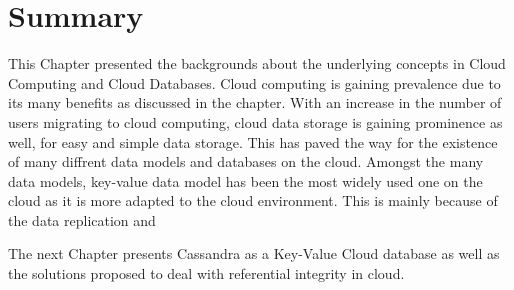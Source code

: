 \section{Summary}
	This Chapter presented the backgrounds about the underlying concepts in Cloud
	Computing and Cloud Databases. Cloud computing is gaining prevalence due to its
	many benefits as discussed in the chapter. With an increase in the number of
	users migrating to cloud computing, cloud data storage is gaining prominence as
	well, for easy and simple data storage. This has paved the way for the
	existence of many diffrent data models and databases on the cloud. Amongst the
	many data models, key-value data model has been the most widely used one on the
	cloud as it is more adapted to the cloud environment. This is mainly because
	of the data replication and 
	
	The next Chapter presents Cassandra as a Key-Value Cloud database as well as
	the solutions proposed to deal with referential integrity in cloud.





